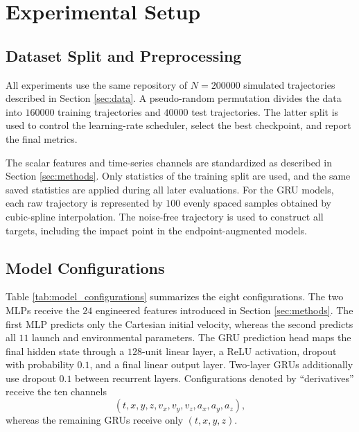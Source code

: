 \section{Experimental Setup}
\label{sec:experimental_setup}

\subsection{Dataset Split and Preprocessing}

All experiments use the same repository of $N=200000$ simulated trajectories described in Section \ref{sec:data}. A pseudo-random permutation divides the data into $160000$ training trajectories and $40000$ test trajectories. The latter split is used to control the learning-rate scheduler, select the best checkpoint, and report the final metrics.

The scalar features and time-series channels are standardized as described in Section \ref{sec:methods}. Only statistics of the training split are used, and the same saved statistics are applied during all later evaluations. For the GRU models, each raw trajectory is represented by $100$ evenly spaced samples obtained by cubic-spline interpolation. The noise-free trajectory is used to construct all targets, including the impact point in the endpoint-augmented models.

\subsection{Model Configurations}

Table \ref{tab:model_configurations} summarizes the eight configurations. The two MLPs receive the $24$ engineered features introduced in Section \ref{sec:methods}. The first MLP predicts only the Cartesian initial velocity, whereas the second predicts all $11$ launch and environmental parameters.
The GRU prediction head maps the final hidden state through a $128$-unit linear layer, a ReLU activation, dropout with probability $0.1$, and a final linear output layer. Two-layer GRUs additionally use dropout $0.1$ between recurrent layers.
Configurations denoted by \enquote{derivatives} receive the ten channels
\begin{equation*}
    (t,x,y,z,v_x,v_y,v_z,a_x,a_y,a_z),
\end{equation*}
whereas the remaining GRUs receive only $(t,x,y,z)$.

